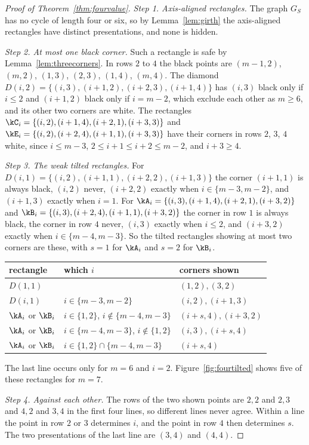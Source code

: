 \begin{proof}[Proof of Theorem~\ref{thm:fourvalue}]
\emph{Step 1. Axis-aligned rectangles.} The graph $G_S$ has no cycle of length four or six, so by Lemma~\ref{lem:girth} the axis-aligned rectangles have distinct presentations, and none is hidden.

\emph{Step 2. At most one black corner.} Such a rectangle is safe by Lemma~\ref{lem:threecorners}. In rows $2$ to $4$ the black points are $(m-1,2)$, $(m,2)$, $(1,3)$, $(2,3)$, $(1,4)$, $(m,4)$. The diamond $D(i,2)=\{(i,3),(i+1,2),(i+2,3),(i+1,4)\}$ has $(i,3)$ black only if $i\le2$ and $(i+1,2)$ black only if $i=m-2$, which exclude each other as $m\ge6$, and its other two corners are white. The rectangles $\kC_i=\{(i,2),(i+1,4),(i+2,1),(i+3,3)\}$ and $\kE_i=\{(i,2),(i+2,4),(i+1,1),(i+3,3)\}$ have their corners in rows $2$, $3$, $4$ white, since $i\le m-3$, $2\le i+1\le i+2\le m-2$, and $i+3\ge4$.

\emph{Step 3. The weak tilted rectangles.} For $D(i,1)=\{(i,2),(i+1,1),(i+2,2),(i+1,3)\}$ the corner $(i+1,1)$ is always black, $(i,2)$ never, $(i+2,2)$ exactly when $i\in\{m-3,m-2\}$, and $(i+1,3)$ exactly when $i=1$. For $\kA_i=\{(i,3),(i+1,4),(i+2,1),(i+3,2)\}$ and $\kB_i=\{(i,3),(i+2,4),(i+1,1),(i+3,2)\}$ the corner in row $1$ is always black, the corner in row $4$ never, $(i,3)$ exactly when $i\le2$, and $(i+3,2)$ exactly when $i\in\{m-4,m-3\}$. So the tilted rectangles showing at most two corners are these, with $s=1$ for $\kA_i$ and $s=2$ for $\kB_i$.
\begin{center}\small
\begin{tabular}{@{}lll@{}}
\toprule
rectangle & which $i$ & corners shown\\
\midrule
$D(1,1)$ & & $(1,2),(3,2)$\\
$D(i,1)$ & $i\in\{m-3,m-2\}$ & $(i,2),(i+1,3)$\\
$\kA_i$ or $\kB_i$ & $i\in\{1,2\}$, $i\notin\{m-4,m-3\}$ & $(i+s,4),(i+3,2)$\\
$\kA_i$ or $\kB_i$ & $i\in\{m-4,m-3\}$, $i\notin\{1,2\}$ & $(i,3),(i+s,4)$\\
$\kA_i$ or $\kB_i$ & $i\in\{1,2\}\cap\{m-4,m-3\}$ & $(i+s,4)$\\
\bottomrule
\end{tabular}
\end{center}
The last line occurs only for $m=6$ and $i=2$. Figure~\ref{fig:fourtilted} shows five of these rectangles for $m=7$.

\emph{Step 4. Against each other.} The rows of the two shown points are $2,2$ and $2,3$ and $4,2$ and $3,4$ in the first four lines, so different lines never agree. Within a line the point in row $2$ or $3$ determines $i$, and the point in row $4$ then determines $s$. The two presentations of the last line are $(3,4)$ and $(4,4)$.


\end{proof}

